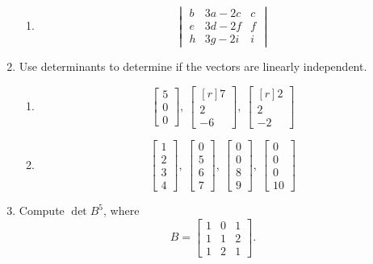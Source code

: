 \documentclass[12pt]{article}
\begin{document}
\begin{multicols*}{2}
\begin{enumerate}
\begin{enumerate}
			\item \[
			\begin{vmatrix}
				b & 3a-2c & c\\
				e & 3d-2f & f\\
				h & 3g-2i & i
			\end{vmatrix}
			\]
		\end{enumerate}
		\vfill\null\columnbreak

		\item Use determinants to determine if the vectors are linearly independent.
		\begin{enumerate}
			\item \[
			\begin{bmatrix}
				5\\0\\0
			\end{bmatrix},\ \begin{bmatrix*}[r]
				7\\2\\-6
			\end{bmatrix*},\ \begin{bmatrix*}[r]
				2\\2\\-2
			\end{bmatrix*}
			\]
			\vfill
			\item \[
			\begin{bmatrix}
				1\\2\\3\\4
			\end{bmatrix},\ \begin{bmatrix}
				0\\5\\6\\7
			\end{bmatrix},\ \begin{bmatrix}
				0\\0\\8\\9
			\end{bmatrix},\ \begin{bmatrix}
				0\\0\\0\\10
			\end{bmatrix}
			\]
			\vfill
		\end{enumerate}

		\item Compute $\det B^5$, where
		\[B = \begin{bmatrix}
			1 & 0 & 1\\
			1 & 1 & 2\\
			1 & 2 & 1
		\end{bmatrix}.\]
		\vfill


\end{enumerate}
\end{multicols*}
\end{document}
